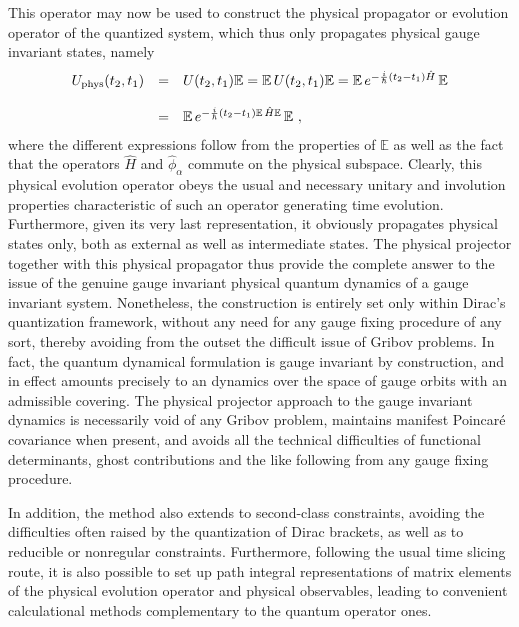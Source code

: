 \documentclass[a4paper,11pt]{article}
\def\proj{\mathbb E}
\begin{document}
This operator may now be used to construct the physical propagator or
evolution operator of the quantized system, which thus only propagates
physical gauge invariant states, namely
\begin{equation}
\begin{array}{r c l}
U_{\rm phys}(t_2,t_1)&=&U(t_2,t_1)\proj=
\proj\,U(t_2,t_1)\proj=\proj\,e^{-\frac{i}{\hbar}(t_2-t_1)\hat{H}}\,\proj\\
 & & \\
&=&\proj\,e^{-\frac{i}{\hbar}(t_2-t_1)\proj\,\hat{H}\proj}\,\proj\ ,
\end{array}
\end{equation}
where the different expressions follow from the properties of $\proj$
as well as the fact that the operators $\hat{H}$ and $\hat{\phi}_\alpha$
commute on the physical subspace. Clearly, this physical evolution
operator obeys the usual and necessary unitary and involution properties
characteristic of such an operator generating time evolution.
Furthermore, given its very last representation, it obviously propagates
physical states only, both as external as well as intermediate states.
The physical projector together with this physical propagator thus
provide the complete answer to the issue of the genuine gauge invariant
physical quantum dynamics of a gauge invariant system. Nonetheless,
the construction is entirely set only within Dirac's quantization
framework, without any need for any gauge fixing procedure of any sort,
thereby avoiding from the outset the difficult issue of Gribov problems.
In fact, the quantum dynamical formulation is gauge invariant by
construction, and in effect amounts precisely to an dynamics over the
space of gauge orbits with an admissible covering. The physical projector
approach to the gauge invariant dynamics is necessarily void of any Gribov
problem,\cite{JG6} maintains manifest Poincar\'e covariance when present,
and avoids all the technical difficulties of functional determinants,
ghost contributions and the like following from any gauge fixing procedure.

In addition, the method also extends\cite{Klaud1} to second-class constraints, 
avoiding the difficulties often raised by the quantization of Dirac brackets,
as well as to reducible or nonregular constraints. Furthermore,
following the usual time slicing route, it is also possible to set up
path integral representations of matrix elements of the physical
evolution operator and physical observables, leading to convenient
calculational methods complementary to the quantum operator ones.
\end{document}
